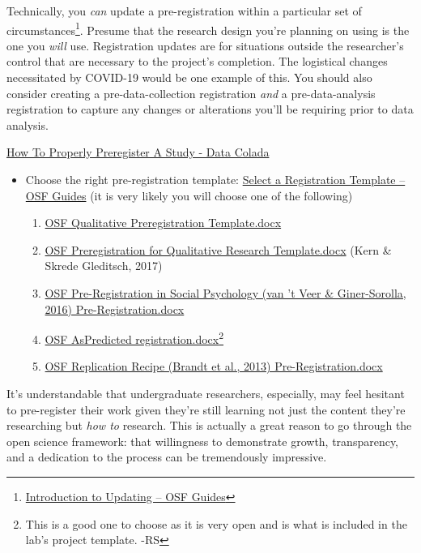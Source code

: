 \documentclass[]{tufte-book}
\providecommand{\tightlist}{%
  \setlength{\itemsep}{0pt}\setlength{\parskip}{0pt}}
\begin{document}
Technically, you \emph{can} update a pre-registration within a particular set of circumstances\footnote{\href{https://help.osf.io/hc/en-us/articles/4414482864663-Introduction-to-Updating-}{Introduction to Updating -- OSF Guides}}. Presume that the research design you're planning on using is the one you \emph{will} use. Registration updates are for situations outside the researcher's control that are necessary to the project's completion. The logistical changes necessitated by COVID-19 would be one example of this. You should also consider creating a pre-data-collection registration \emph{and} a pre-data-analysis registration to capture any changes or alterations you'll be requiring prior to data analysis.

\href{http://datacolada.org/64}{How To Properly Preregister A Study - Data Colada}

\begin{itemize}
\tightlist
\item
  Choose the right pre-registration template: \href{https://help.osf.io/hc/en-us/articles/360019738794-Select-a-Registration-Template}{Select a Registration Template -- OSF Guides} (it is very likely you will choose one of the following)

  \begin{enumerate}
  \def\labelenumi{\arabic{enumi}.}
  \tightlist
  \item
    \href{https://osf.io/w4ac2/}{OSF \textbar{} Qualitative Preregistration Template.docx}
  \item
    \href{https://osf.io/b6xmd/}{OSF \textbar{} Preregistration for Qualitative Research Template.docx} (Kern \& Skrede Gleditsch, 2017)
  \item
    \href{https://osf.io/ce3hr/}{OSF \textbar{} Pre-Registration in Social Psychology (van 't Veer \& Giner-Sorolla, 2016) Pre-Registration.docx}
  \item
    \href{https://osf.io/fnsb6/}{OSF \textbar{} AsPredicted registration.docx}\footnote{This is a good one to choose as it is very open and is what is included in the lab's project template. -RS}
  \item
    \href{https://osf.io/4jd46/}{OSF \textbar{} Replication Recipe (Brandt et al., 2013) Pre-Registration.docx}
  \end{enumerate}
\end{itemize}

It's understandable that undergraduate researchers, especially, may feel hesitant to pre-register their work given they're still learning not just the content they're researching but \emph{how to} research. This is actually a great reason to go through the open science framework: that willingness to demonstrate growth, transparency, and a dedication to the process can be tremendously impressive.
\end{document}
